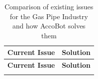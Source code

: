 \documentclass[11pt]{article}		%
\begin{document}
		
		
		{\RaggedRight
		
		\begin{longtable}[c]{| m{} | m{} |}
		
			\hline
			\rowcolor{headerBlue} \textbf{Current Issue} & \textbf{Solution}\\
			\hline
			\endfirsthead

			\hline
			\rowcolor{headerBlue} \textbf{Current Issue} & \textbf{Solution}\\
			\hline
			\endhead
			
			\hline
			\caption{Comparison of existing issues for the Gas Pipe Industry and how AccoBot solves them}
			\endlastfoot
			

\end{longtable}}
\end{document}
